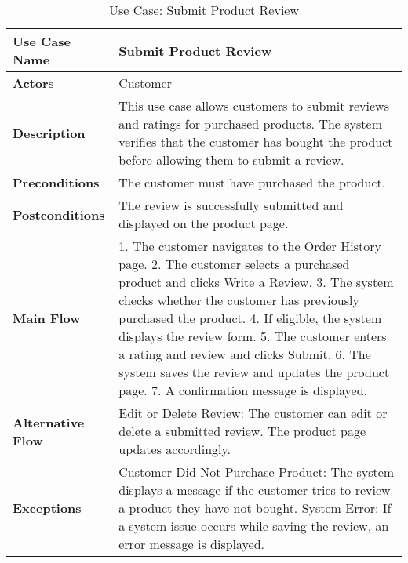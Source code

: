 \begin{table}[h]
\centering
\begin{tabular}{|p{3cm}|p{10cm}|}
\hline
\textbf{Use Case Name} & Submit Product Review \\
\hline
\textbf{Actors} & Customer \\
\hline
\textbf{Description} & This use case allows customers to submit reviews and ratings for purchased products. The system verifies that the customer has bought the product before allowing them to submit a review. \\
\hline
\textbf{Preconditions} & The customer must have purchased the product. \\
\hline
\textbf{Postconditions} & The review is successfully submitted and displayed on the product page. \\
\hline
\textbf{Main Flow} & 1. The customer navigates to the Order History page. 2. The customer selects a purchased product and clicks Write a Review. 3. The system checks whether the customer has previously purchased the product. 4. If eligible, the system displays the review form. 5. The customer enters a rating and review and clicks Submit. 6. The system saves the review and updates the product page. 7. A confirmation message is displayed. \\
\hline
\textbf{Alternative Flow} & Edit or Delete Review: The customer can edit or delete a submitted review. The product page updates accordingly. \\
\hline
\textbf{Exceptions} & Customer Did Not Purchase Product: The system displays a message if the customer tries to review a product they have not bought. System Error: If a system issue occurs while saving the review, an error message is displayed. \\
\hline
\end{tabular}
\caption{Use Case: Submit Product Review}
\end{table}


